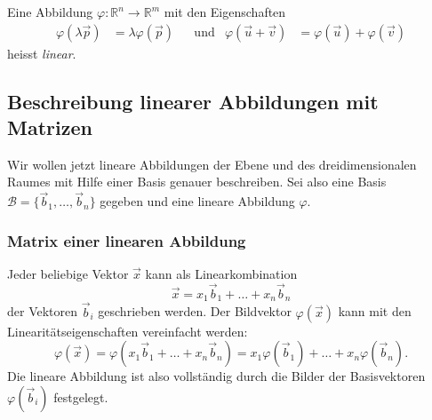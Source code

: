\begin{definition}
Eine Abbildung $\varphi\colon \mathbb R^n \to \mathbb R^m$ mit den
Eigenschaften
\begin{align*}
\varphi(\lambda\vec{p})&=\lambda\varphi(\vec{p})
&&\text{und}&
\varphi(\vec{u}+\vec{v})&=\varphi(\vec{u}) + \varphi(\vec{v})
\end{align*}
heisst {\em linear}.
\end{definition}

%
%
\subsection{Beschreibung linearer Abbildungen mit Matrizen}
Wir wollen jetzt lineare Abbildungen der Ebene und des dreidimensionalen
Raumes mit Hilfe einer Basis genauer beschreiben.
Sei also eine Basis $\mathcal{B}=\{\vec{b}_1,\dots,\vec{b}_n\}$ 
gegeben und eine lineare Abbildung $\varphi$.

\subsubsection{Matrix einer linearen Abbildung}
Jeder beliebige Vektor $\vec{x}$ kann als Linearkombination
\[
\vec{x}
=
x_1\vec{b}_1
+\dots+
x_n\vec{b}_n
\]
der Vektoren $\vec{b}_i$ geschrieben werden.
Der Bildvektor $\varphi(\vec{x})$ kann mit den Linearitätseigenschaften
vereinfacht werden:
\[
\varphi(\vec{x})
=
\varphi(
x_1\vec{b}_1
+\dots+
x_n\vec{b}_n
)
=
x_1\varphi(\vec{b}_1)
+\dots+
x_n\varphi(\vec{b}_n).
\]
Die lineare Abbildung ist also vollständig durch die Bilder der Basisvektoren
$\varphi(\vec{b}_i)$ festgelegt.

